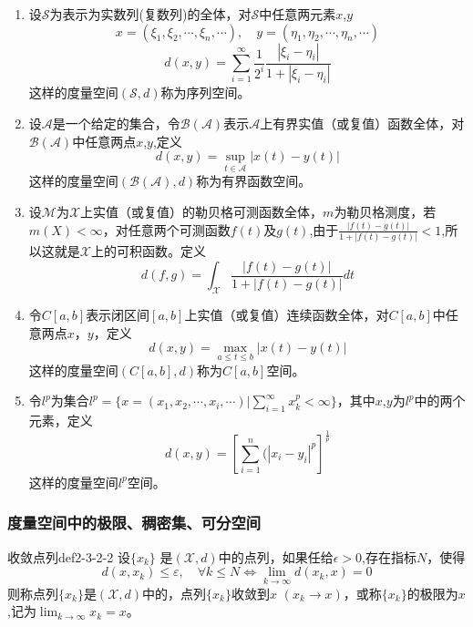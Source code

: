 \begin{example}
\begin{enumerate}
		\item 设$\mathcal{S}$为表示为实数列(复数列)的全体，对$\mathcal{S}$中任意两元素$x$,$y$
			$$x = (\xi_1,\xi_2,\cdots,\xi_n,\cdots), \quad y = (\eta_1,\eta_2,\cdots,\eta_n,\cdots)$$
			\begin{equation}
			d(x,y)  = \sum_{i=1}^{\infty} \frac{1}{2^i}\frac{|\xi_i-\eta_i|}{1+|\xi_i-\eta_i|}
			\end{equation}
			这样的度量空间$(\mathcal{S},d)$称为序列空间。
		\item
			设$\mathcal{A}$是一个给定的集合，令$\mathcal{B}(\mathcal{A})$表示$\mathcal{A}$上有界实值（或复值）函数全体，对$\mathcal{B}(\mathcal{A})$中任意两点$x$,$y$,定义
			\begin{equation}
				d(x, y)=\sup _{t \in \mathcal{A}}|x(t)-y(t)|
			\end{equation}
			这样的度量空间$(\mathcal{B}(\mathcal{A}),d)$称为有界函数空间。
		\item
			设$\mathcal{M}$为$\mathcal{X}$上实值（或复值）的勒贝格可测函数全体，$m$为勒贝格测度，若$m(X)<\infty$，对任意两个可测函数$f(t)$及$g(t)$,由于$ \displaystyle \frac{|f(t)-g(t)|}{1+|f(t)-g(t)|}<1 $,所以这就是$\mathcal{X}$上的可积函数。定义
			\begin{equation}
				d(f, g)= \int_{\mathcal{X}}\frac{|f(t)-g(t)|}{1+|f(t)-g(t)|}dt
			\end{equation}
		\item
			令$C[a,b]$表示闭区间$[a,b]$上实值（或复值）连续函数全体，对$C[a,b]$中任意两点$x$，$y$，定义
			\begin{equation}
				d(x, y)=  \max_{a\le t \le b} |x(t)-y(t)|
			\end{equation}
			这样的度量空间$(C[a,b],d)$称为$C[a,b]$空间。
		\item
			令$l^p$为集合$\displaystyle l^p =\{ x = (x_1,x_2,\cdots,x_i,\cdots ) |\sum_{i=1}^{\infty}x^p_k < \infty \}$，其中$x$,$y$为$l^p$中的两个元素，定义
			\begin{equation}
			d(x,y) = [\sum_{i=1}^{n}(|x_i-y_i|^p]^{\frac{1}{p}}
			\end{equation}
			这样的度量空间$l^p$空间。
		\end{enumerate}
	\end{example}

\subsubsection{度量空间中的极限、稠密集、可分空间}

	\begin{definition}{收敛点列}{def2-3-2-2}
		设$\{x_k\}$ 是$(\mathcal{X},d)$中的点列，如果任给$\epsilon>0$,存在指标$N$，使得
		$$d(x,x_k) \le \varepsilon, \quad  \forall k\le N \Leftrightarrow \lim _{k \rightarrow \infty} d\left(x_{k}, x\right)=0$$
		则称点列$\{x_k\}$是$(\mathcal{X},d)$中的，点列$\{x_k\}$收敛到$x$ $(x_k \rightarrow x )$，或称$\{x_k\}$的极限为$x$,记为$\displaystyle \lim _{k \rightarrow \infty} x_{k}=x$。
	\end{definition}

